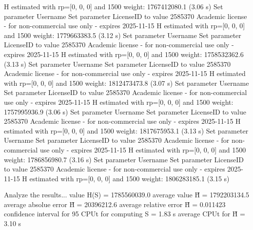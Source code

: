   H estimated with rp=[0, 0, 0] and 1500 weight:  1767412080.1  (3.06 s)
Set parameter Username
Set parameter LicenseID to value 2585370
Academic license - for non-commercial use only - expires 2025-11-15
  H estimated with rp=[0, 0, 0] and 1500 weight:  1779663383.5  (3.12 s)
Set parameter Username
Set parameter LicenseID to value 2585370
Academic license - for non-commercial use only - expires 2025-11-15
  H estimated with rp=[0, 0, 0] and 1500 weight:  1758532362.6  (3.13 s)
Set parameter Username
Set parameter LicenseID to value 2585370
Academic license - for non-commercial use only - expires 2025-11-15
  H estimated with rp=[0, 0, 0] and 1500 weight:  1812473473.8  (3.07 s)
Set parameter Username
Set parameter LicenseID to value 2585370
Academic license - for non-commercial use only - expires 2025-11-15
  H estimated with rp=[0, 0, 0] and 1500 weight:  1757995936.9  (3.06 s)
Set parameter Username
Set parameter LicenseID to value 2585370
Academic license - for non-commercial use only - expires 2025-11-15
  H estimated with rp=[0, 0, 0] and 1500 weight:  1817675953.1  (3.13 s)
Set parameter Username
Set parameter LicenseID to value 2585370
Academic license - for non-commercial use only - expires 2025-11-15
  H estimated with rp=[0, 0, 0] and 1500 weight:  1786856980.7  (3.16 s)
Set parameter Username
Set parameter LicenseID to value 2585370
Academic license - for non-commercial use only - expires 2025-11-15
  H estimated with rp=[0, 0, 0] and 1500 weight:  1806283185.1  (3.15 s)

Analyze the results...
  value H(S)                  = 1785560039.0 
  average value H̃             = 1792203134.5 
  average absolue error H̃     = 20396212.6 
  average relative error H̃    = 0.011423 
  confidence interval for 95%
  CPUt for computing S         = 1.83 s
  average CPUt for H̃           = 3.10 s

